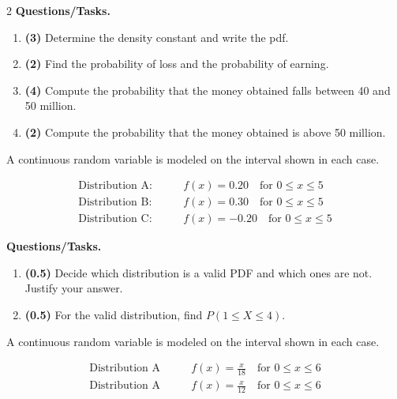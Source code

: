 \begin{multicols}{2}
		\textbf{Questions/Tasks.}
		\begin{enumerate}[label=\textbf{\alph*)}]
			\item \textbf{(3)} Determine the density constant and write the pdf.
			\item \textbf{(2)} Find the probability of loss and the probability of earning.
			\item \textbf{(4)} Compute the probability that the money obtained falls between 40 and 50 million.
			\item \textbf{(2)} Compute the probability that the money obtained is above 50 million.
		\end{enumerate}
		
		\newpage
		\vspace{-0.3cm}
		A continuous random variable is modeled on the interval shown in each case.
		
		\[
		\begin{aligned}
			\text{Distribution A:} & \qquad f(x)=0.20 \quad \text{for } 0\le x\le 5 \\[0.3em]
			\text{Distribution B:} & \qquad  f(x)=0.30 \quad \text{for } 0\le x\le 5 \\[0.3em]
			\text{Distribution C:} & \qquad  f(x)=-0.20 \quad \text{for } 0\le x\le 5
		\end{aligned}
		\]
		
		\textbf{Questions/Tasks.}
		\begin{enumerate}[label=\textbf{\alph*)}]
			\item \textbf{(0.5)} Decide which distribution is a valid PDF and which ones are not. Justify your answer.
			\item \textbf{(0.5)} For the valid distribution, find $P(1\le X\le 4)$.
		\end{enumerate}
		
		\vspace{0.25cm}
		\vspace{-0.3cm}
		
		A continuous random variable is modeled on the interval shown in each case.
		
		
		\[ \begin{aligned}
			\text{Distribution A} & \qquad f(x)=\frac{x}{18}\quad\text{for }0\le x\le 6 \\
			\text{Distribution A} & \qquad f(x)=\frac{x}{12}\quad\text{for }0\le x\le 6
		\end{aligned} \]
		

\end{multicols}
